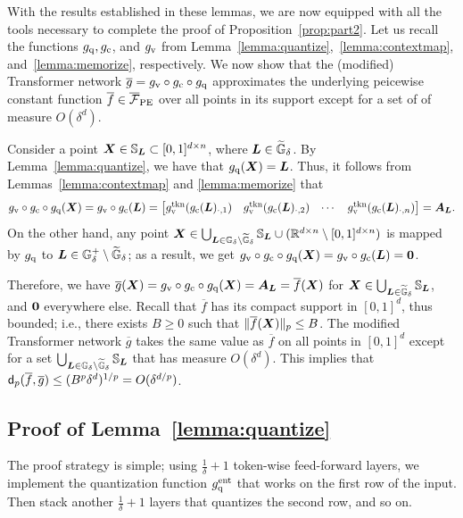 With the results established in these lemmas, we are now equipped with all the tools necessary to complete the proof of Proposition~\ref{prop:part2}. Let us recall the functions $g_{\rm q}, g_{\rm c}$, and $g_{\rm v}$ from Lemma~\ref{lemma:quantize},~\ref{lemma:contextmap}, and~\ref{lemma:memorize}, respectively. We now show that the (modified) Transformer network $\overline{g} = g_{\rm v}\circ g_{\rm c} \circ g_{\rm q}$ approximates the underlying peicewise constant function $\overline{f} \in \overline{\mathcal{F}}_{\rm PE}$ over all points in its support except for a set of of measure $O(\delta^d)$.

Consider a point ${\bm{X}} \in {\mathbb{S}}_{\bm{L}} \subset [0,1]^{d \times n}$, where ${\bm{L}} \in \widetilde{{\mathbb{G}}}_{\delta}$. By Lemma~\ref{lemma:quantize}, we have that $g_{\rm q}({\bm{X}}) = {\bm{L}}$. Thus, it follows from Lemmas~\ref{lemma:contextmap} and \ref{lemma:memorize} that
$$
g_{\rm v}\circ g_{\rm c} \circ g_{\rm q}({\bm{X}}) = g_{\rm v}\circ g_{\rm c}({\bm{L}}) = \begin{bmatrix}
    g_{\rm v}^{\rm tkn} (g_{\rm c}({\bm{L}})_{\cdot, 1}) &
    g_{\rm v}^{\rm tkn} (g_{\rm c}({\bm{L}})_{\cdot, 2}) &
    \cdots &
    g_{\rm v}^{\rm tkn} (g_{\rm c}({\bm{L}})_{\cdot, n})
    \end{bmatrix}
    =
    {\bm{A}}_{\bm{L}}.
$$
On the other hand, any point ${\bm{X}} \in \bigcup_{{\bm{L}} \in {\mathbb{G}}_{\delta} \setminus \widetilde{{\mathbb{G}}}_{\delta}} {\mathbb{S}}_{\bm{L}} \cup (\mathbb{R}^{d\times n} \setminus [0,1]^{d \times n})$ is mapped by $g_{\rm q}$ to ${\bm{L}} \in {\mathbb{G}}^+_{\delta} \setminus \widetilde{{\mathbb{G}}}_{\delta}$; as a result, we get $g_{\rm v}\circ g_{\rm c} \circ g_{\rm q}({\bm{X}}) = g_{\rm v} \circ g_{\rm c} ({\bm{L}}) = {\bm{0}}$.

Therefore, we have $\overline{g}({\bm{X}}) = g_{\rm v} \circ g_{\rm c} \circ g_{\rm q}({\bm{X}}) = {\bm{A}}_{\bm{L}} = \overline f({\bm{X}})$ for ${\bm{X}} \in \bigcup_{{\bm{L}} \in \widetilde{{\mathbb{G}}}_{\delta}} {\mathbb{S}}_{\bm{L}}$, and ${\bm{0}}$ everywhere else. Recall that $\overline{f}$ has its compact support in $[0,1]^{d}$, thus bounded; i.e., there exists $B \geq 0$ such that $\|{\overline f({\bm{X}})}\|_p \leq B$. The modified Transformer network $\overline{g}$ takes the same value as $\overline{f}$ on all points in $[0,1]^{d}$ except for a set $\bigcup_{{\bm{L}} \in {\mathbb{G}}_{\delta} \setminus \widetilde{{\mathbb{G}}}_{\delta}} {\mathbb{S}}_{\bm{L}}$ that has measure $O(\delta^d)$. This implies that $\mathsf{d}_p(\overline{f}, \overline{g}) \leq (B^p \delta^d)^{1/p} = O(\delta^{d/p})$.

\subsection{Proof of Lemma~\ref{lemma:quantize}}
The proof strategy is simple; using $\frac{1}{\delta}+1$ token-wise feed-forward layers, we implement the quantization function $g_{\rm q}^{\rm ent}$ that works on the first row of the input. Then stack another $\frac{1}{\delta}+1$ layers that quantizes the second row, and so on.


